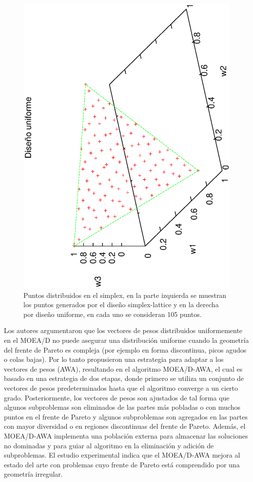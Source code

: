 \begin{figure}[H]
\includegraphics[scale=0.27, angle=-90,origin=c]
{Figures_Chapter4/uniform.eps}
\decoRule
\caption{Puntos distribuidos en el simplex, en la parte izquierda se muestran los puntos generados por el diseño simplex-lattice y en la derecha por diseño uniforme, en cada uno se consideran 105 puntos.}
\label{fig:simplex_puntos}
\end{figure}



Los autores \cite{Joel:MOEAD_AWA} argumentaron que los vectores de pesos distribuidos uniformemente en el MOEA/D no puede asegurar una distribución uniforme cuando la geometría del frente de Pareto es compleja (por ejemplo en forma discontinua, picos agudos o colas bajas).
%
Por lo tanto propusieron una estrategia para adaptar a los vectores de pesos (AWA), resultando en el algoritmo MOEA/D-AWA, el cual es basado en una estrategia de dos etapas, donde primero se utiliza un conjunto de vectores de pesos predeterminados hasta que el algoritmo converge a un cierto grado.
%
Posteriormente, los vectores de pesos son ajustados de tal forma que algunos subproblemas son eliminados de las partes más pobladas o con muchos puntos en el frente de Pareto y algunos subproblemas son agregados en las partes con mayor diversidad o en regiones discontinuas del frente de Pareto.
%
Además, el MOEA/D-AWA implementa una población externa para almacenar las soluciones no dominadas y para guiar al algoritmo en la eliminación y adición de subproblemas.
%
El estudio experimental indica que el MOEA/D-AWA mejora al estado del arte con problemas cuyo frente de Pareto está comprendido por una geometría irregular.
%


